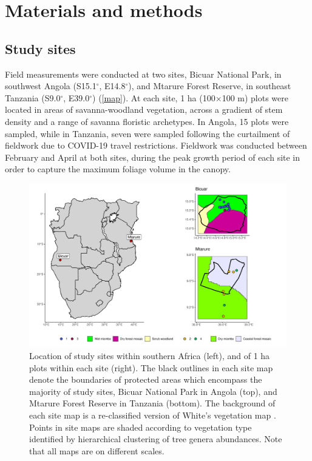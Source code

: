 \documentclass[11pt,a4paper]{article}
\begin{document}
\section{Materials and methods}

\subsection{Study sites}

Field measurements were conducted at two sites, Bicuar National Park, in southwest Angola (S15.1$^\circ$, E14.8$^\circ$), and Mtarure Forest Reserve, in southeast Tanzania (S9.0$^\circ$, E39.0$^\circ$) (\autoref{map}). At each site, 1 ha (100$\times$100 m) plots were located in areas of savanna-woodland vegetation, across a gradient of stem density and a range of savanna floristic archetypes. In Angola, 15 plots were sampled, while in Tanzania, seven were sampled following the curtailment of fieldwork due to COVID-19 travel restrictions. Fieldwork was conducted between February and April at both sites, during the peak growth period of each site in order to capture the maximum foliage volume in the canopy.

\begin{figure}
	\includegraphics[width=\linewidth]{map}
	\caption{Location of study sites within southern Africa (left), and of 1 ha plots within each site (right). The black outlines in each site map denote the boundaries of protected areas which encompass the majority of study sites, Bicuar National Park in Angola (top), and Mtarure Forest Reserve in Tanzania (bottom). The background of each site map is a re-classified version of White's vegetation map \citep{White1983}. Points in site maps are shaded according to vegetation type identified by hierarchical clustering of tree genera abundances. Note that all maps are on different scales.}
	\label{map}
\end{figure}
\end{document}
